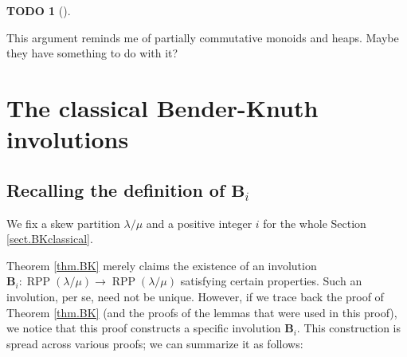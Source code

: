 \documentclass[numbers=enddot,12pt,final,onecolumn,notitlepage]{scrartcl}%
\theoremstyle{definition}
\newtheorem{quest}[theo]{TODO}
\newenvironment{todo}[1][]
{\begin{quest}[#1]\begin{leftbar}}
{\end{leftbar}\end{quest}}
\begin{document}
\begin{todo}
This argument reminds me of partially commutative monoids and heaps. Maybe
they have something to do with it?
\end{todo}

\section{\label{sect.BKclassical}The classical Bender-Knuth involutions}

\subsection{Recalling the definition of $\mathbf{B}_{i}$}

We fix a skew partition $\lambda/\mu$ and a positive integer $i$ for the whole
Section \ref{sect.BKclassical}.

Theorem \ref{thm.BK} merely claims the existence of an involution
$\mathbf{B}_{i}:\operatorname*{RPP}\left(  \lambda/\mu\right)  \rightarrow
\operatorname*{RPP}\left(  \lambda/\mu\right)  $ satisfying certain
properties. Such an involution, per se, need not be unique. However, if we
trace back the proof of Theorem \ref{thm.BK} (and the proofs of the lemmas
that were used in this proof), we notice that this proof constructs a specific
involution $\mathbf{B}_{i}$. This construction is spread across various
proofs; we can summarize it as follows:
\end{document}
